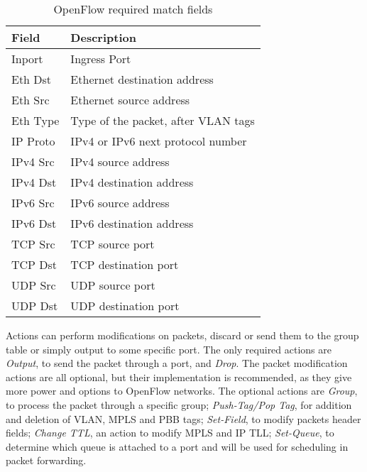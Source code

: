 \begin{table}[H]
\caption{OpenFlow required match fields}\label{tab:OFRequired}
\centering
\begin{tabular}{|l|l|}
\hline
\textbf{Field} & \textbf{Description}                \\ \hline
Inport         & Ingress Port                        \\ \hline
Eth Dst        & Ethernet destination address         \\ \hline
Eth Src        & Ethernet source address              \\ \hline
Eth Type       & Type of the packet, after VLAN tags \\ \hline
IP Proto       & IPv4 or IPv6 next protocol number   \\ \hline
IPv4 Src       & IPv4 source address                 \\ \hline
IPv4 Dst       & IPv4 destination address             \\ \hline
IPv6 Src       & IPv6 source address                 \\ \hline
IPv6 Dst       & IPv6 destination address            \\ \hline
TCP Src        & TCP source port                     \\ \hline
TCP Dst        & TCP destination port                \\ \hline
UDP Src        & UDP source port                     \\ \hline
UDP Dst        & UDP destination port                \\ \hline
\end{tabular}
\label{my-label}
\end{table}

Actions can perform modifications on packets, discard or send them to the group table or simply output to some specific port. The only required actions are \textit{Output}, to send the packet through a port, and \textit{Drop}. The packet modification actions are all optional, but their implementation is recommended, as they give more power and options to OpenFlow networks. The optional actions are \textit{Group}, to process the packet through a specific group; \textit{Push-Tag/Pop Tag}, for addition and deletion of VLAN, MPLS and PBB tags; \textit{Set-Field}, to modify packets header fields; \textit{Change TTL}, an action to modify MPLS and IP TLL; \textit{Set-Queue}, to determine which queue is attached to a port and will be used for scheduling in packet forwarding.

